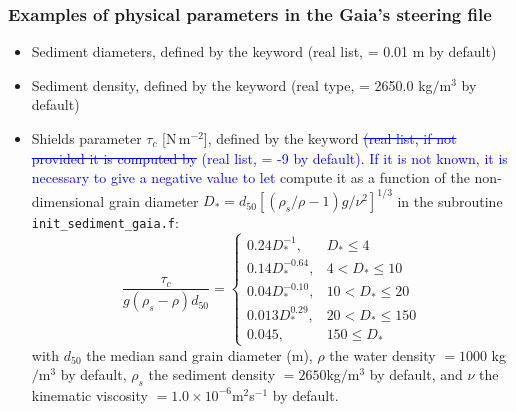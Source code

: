 {\subsubsection{Examples of physical parameters in the Gaia's steering file}
\begin{itemize}
\item Sediment diameters, defined by the keyword  (real list, {\ttfamily = 0.01} m by default)
\item Sediment density, defined by the keyword  (real type, {\ttfamily = 2650.0} kg$/$m$^3$ by default)
\item Shields parameter $\tau_c$ [N\,m$^{-2}$], defined by the keyword  \textcolor{blue}{\sout{(real list, if not provided it is computed by \gaia{}}} \textcolor{blue}{(real list, = -9 by default). If it is not known, it is necessary to give a negative value to let \gaia{}} compute it as a function of the non-dimensional grain diameter $D_*=d_{50}[(\rho_s/\rho-1)g/\nu^2]^{1/3}$ in the subroutine \texttt{init\_sediment\_gaia.f}:
\begin{equation*}
\frac{\tau_c}{g(\rho_s -\rho)d_{50}}=\left\{\begin{array}{ll}
0.24 D_*^{-1}, & D_* \leq 4 \\
0.14 D_*^{-0.64}, & 4 < D_* \leq 10 \\
 0.04 D_*^{-0.10}, & 10 < D_* \leq 20\\
0.013 D_*^{0.29}, & 20 < D_* \leq 150 \\
0.045, & 150 \leq D_*
\end{array}
\right.
\end{equation*}
with $d_{50}$ the median sand grain diameter (m), $\rho$ the water density $=1000$ kg$/$m$^3$ by default, $\rho_s$ the sediment density $=2650$kg$/$m$^3$ by default, and $\nu$ the kinematic viscosity $=1.0\times 10^{-6}$m$^2$s$^{-1}$ by default.


\end{itemize}}
